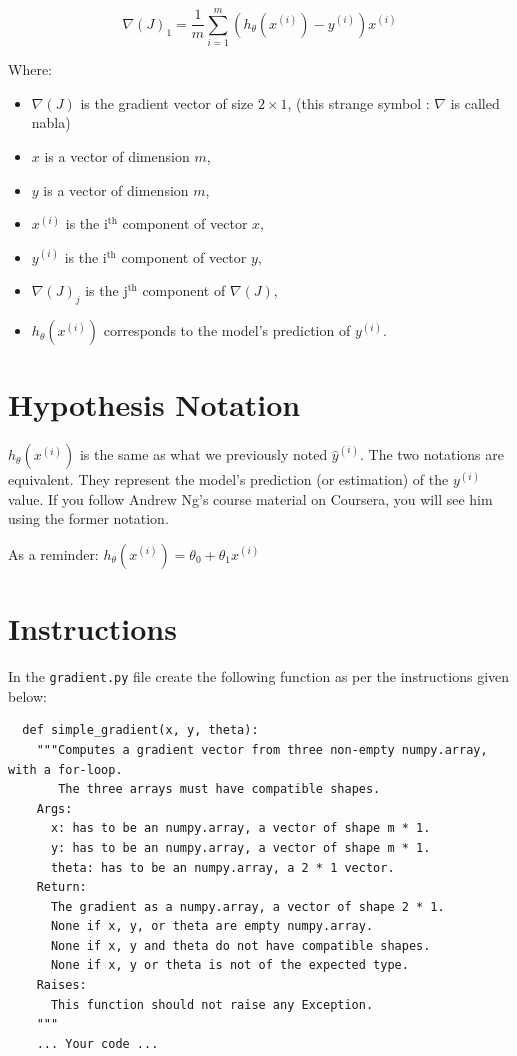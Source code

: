 \documentclass{42-en}
\begin{document}
$$
\nabla(J)_1 = \frac{1}{m}\sum_{i=1}^{m}(h_{\theta}(x^{(i)}) - y^{(i)})x^{(i)}
$$

Where:
\begin{itemize}
  \item $\nabla(J)$ is the gradient vector of size $2 \times 1$, (this strange symbol : $\nabla$ is called nabla)
  \item $x$ is a vector of dimension $m$,
  \item $y$ is a vector of dimension $m$,
  \item $x^{(i)}$ is the i$^\text{th}$ component of vector $x$,
  \item $y^{(i)}$ is the i$^\text{th}$ component of vector $y$,
  \item $\nabla(J)_j$ is the j$^\text{th}$ component of $\nabla(J)$,
  \item $h_{\theta}(x^{(i)})$ corresponds to the model's prediction of $y^{(i)}$.
\end{itemize}

\section*{Hypothesis Notation}
$h_{\theta}(x^{(i)})$ is the same as what we previously noted $\hat{y}^{(i)}$.  
The two notations are equivalent.
They represent the model's prediction (or estimation) of the ${y}^{(i)}$ value.
If you follow Andrew Ng's course material on Coursera, you will see him using the former notation.

As a reminder:
$h_{\theta}(x^{(i)}) = \theta_0 + \theta_1x^{(i)}$


\section*{Instructions}

In the \texttt{gradient.py} file create the following function as per the instructions given below:

\begin{verbatim}
  def simple_gradient(x, y, theta):
    """Computes a gradient vector from three non-empty numpy.array, with a for-loop.
       The three arrays must have compatible shapes.
    Args:
      x: has to be an numpy.array, a vector of shape m * 1.
      y: has to be an numpy.array, a vector of shape m * 1.
      theta: has to be an numpy.array, a 2 * 1 vector.
    Return:
      The gradient as a numpy.array, a vector of shape 2 * 1.
      None if x, y, or theta are empty numpy.array.
      None if x, y and theta do not have compatible shapes.
      None if x, y or theta is not of the expected type.
    Raises:
      This function should not raise any Exception.
    """
    ... Your code ...
\end{verbatim}
\end{document}
